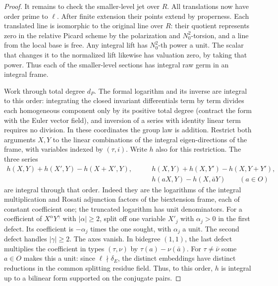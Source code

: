 \begin{proof}
It remains to check the smaller-level jet over \(R\). All translations
now have order prime to \(\ell\). After finite extension their points
extend by properness. Each translated line is isomorphic to the
original line over \(R\): their quotient represents zero in the
relative Picard scheme by the polarization and \(N_0^2\)-torsion,
and a line from the local base is free. Any integral lift has
\(N_0^2\)-th power a unit. The scalar that changes it to the
normalized lift likewise has valuation zero, by taking that power.
Thus each of the smaller-level sections has integral raw germ in
an integral frame.

Work through total degree \(d_P\). The formal logarithm and its
inverse are integral to this order: integrating the closed invariant
differentials term by term divides each homogeneous component only
by its positive total degree (contract the form with the Euler
vector field), and inversion of a series with identity linear term
requires no division. In these coordinates the group law is
addition. Restrict both arguments \(X,Y\) to the linear combinations
of the integral eigen-directions of the frame, with variables
indexed by \((\tau,i)\). Write \(h\) also for this restriction.
The three series
\[
 \begin{split}
 h(X,Y)+h(X',Y)-h(X+X',Y),\qquad&
 h(X,Y)+h(X,Y')-h(X,Y+Y'),\\
 &h(aX,Y)-h(X,\bar aY)\qquad (a\in O)
 \end{split}
\]
are integral through that order. Indeed they are the logarithms
of the integral multiplication and Rosati adjunction factors of the
biextension frame, each of constant coefficient one; the truncated
logarithm has unit denominators. For a coefficient of \(X^\alpha
Y^\gamma\) with \(|\alpha|\ge2\), split off one variable \(X'_j\)
with \(\alpha_j>0\) in the first defect. Its coefficient is
\(-\alpha_j\) times the one sought, with \(\alpha_j\) a unit.
The second defect handles \(|\gamma|\ge2\). The axes vanish.
In bidegree \((1,1)\), the last defect multiplies the coefficient
in types \((\tau,\nu)\) by \(\tau(a)-\nu(\bar a)\).
For \(\tau\ne\bar\nu\) some \(a\in O\) makes this a unit:
since \(\ell\nmid\delta_E\), the distinct embeddings have distinct
reductions in the common splitting residue field. Thus, to this
order, \(h\) is integral up to a bilinear form supported on
the conjugate pairs.


\end{proof}
